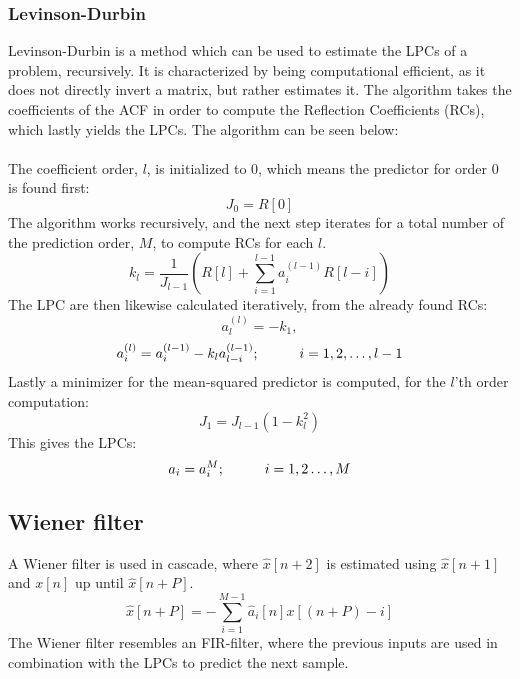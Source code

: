 \subsubsection{Levinson-Durbin}
Levinson-Durbin is a method which can be used to estimate the LPCs of a problem, recursively. It is characterized by being computational efficient, as it does not directly invert a matrix, but rather estimates it.
The algorithm takes the coefficients of the ACF in order to compute the Reflection Coefficients (RCs), which lastly yields the LPCs. The algorithm can be seen below:\\\\
The coefficient order, $l$, is initialized to 0, which means the predictor for order 0 is found first:
\begin{equation}\label{LDInit}
	J_0=R[0]
\end{equation}
The algorithm works recursively, and the next step iterates for a total number of the prediction order, $M$, to compute RCs for each $l$.
\begin{equation}\label{LDStep1}
	k_l=\frac{1}{J_{l-1}} \left ( R[l] + \sum_{i=1}^{l-1} a_i^{(l-1)}R[l-i]   \right) 
\end{equation}
The LPC are then likewise calculated iteratively, from the already found RCs: 
\begin{equation}\label{LDStep2_1}
	a_l^{(l)} = -k_1,
\end{equation}
\begin{equation}\label{LDStep2_2}
a_i^{(l)} = a_i^{(l-1)} - k_l a_{l-i}^{(l-1)} ; \hspace{10mm} i = 1,2,\dotsc,l-1
\end{equation}
Lastly a minimizer for the mean-squared predictor is computed, for the $l$'th order computation:
\begin{equation}\label{LDStep2}
	J_1 = J_{l-1} (1-k_l^2)
\end{equation}
This gives the LPCs:
\begin{equation}
	a_i = a_i^{M}; \hspace{10mm} i = 1,2 \dotsc , M
\end{equation}


\subsection{Wiener filter}
A Wiener filter is used in cascade, where $\hat{x}[n+2]$ is estimated using $\hat{x}[n+1]$ and $x[n]$ up until $\hat{x}[n+P]$. 
\begin{equation}\label{eq:AppPredictor}
\hat{x}[n+P] =- \sum^{M-1}_{i=1}\hat{a}_i[n]x[(n+P)-i]
\end{equation}
The Wiener filter resembles an FIR-filter, where the previous inputs are used in combination with the LPCs to predict the next sample. 

